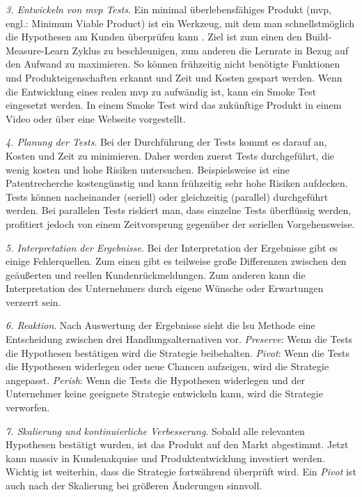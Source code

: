 \textit{3. Entwickeln von \gls{mvp} Tests}. Ein minimal überlebensfähiges Produkt (\gls{mvp}, engl.: Minimum Viable Product) ist ein Werkzeug, mit dem man schnellstmöglich die Hypothesen am Kunden überprüfen kann \cite[93]{Ries2011}. Ziel ist zum einen den Build-Measure-Learn Zyklus zu beschleunigen, zum anderen die Lernrate in Bezug auf den Aufwand zu maximieren. So können frühzeitig nicht benötigte Funktionen und Produkteigenschaften erkannt und Zeit und Kosten gespart werden. Wenn die Entwicklung eines realen \gls{mvp} zu aufwändig ist, kann ein Smoke Test eingesetzt werden. In einem Smoke Test wird das zukünftige Produkt in einem Video oder über eine Webseite vorgestellt.

\textit{4. Planung der Tests}. Bei der Durchführung der Tests kommt es darauf an, Kosten und Zeit zu minimieren. Daher werden zuerst Tests durchgeführt, die wenig kosten und hohe Risiken untersuchen. Beispielsweise ist eine Patentrecherche kostengünstig und kann frühzeitig sehr hohe Risiken aufdecken. Tests können nacheinander (seriell) oder gleichzeitig (parallel) durchgeführt werden. Bei parallelen Tests riskiert man, dass einzelne Tests überflüssig werden, profitiert jedoch von einem Zeitvorsprung gegenüber der seriellen Vorgehensweise. 

\textit{5. Interpretation der Ergebnisse}. Bei der Interpretation der Ergebnisse gibt es einige Fehlerquellen. Zum einen gibt es teilweise große Differenzen zwischen den geäußerten und reellen Kundenrückmeldungen. Zum anderen kann die Interpretation des Unternehmers durch eigene Wünsche oder Erwartungen verzerrt sein.

\textit{6. Reaktion}. Nach Auswertung der Ergebnisse sieht die \gls{lsu} Methode eine Entscheidung zwischen drei Handlungsalternativen vor. \textit{Preserve}: Wenn die Tests die Hypothesen bestätigen wird die Strategie beibehalten. \textit{Pivot}: Wenn die Tests die Hypothesen widerlegen oder neue Chancen aufzeigen, wird die Strategie angepasst. \textit{Perish}: Wenn die Tests die Hypothesen widerlegen und der Unternehmer keine geeignete Strategie entwickeln kann, wird die Strategie verworfen. 

\textit{7. Skalierung und kontinuierliche Verbesserung}. Sobald alle relevanten Hypothesen bestätigt wurden, ist das Produkt auf den Markt abgestimmt. Jetzt kann massiv in Kundenakquise und Produktentwicklung investiert werden. Wichtig ist weiterhin, dass die Strategie fortwährend überprüft wird. Ein \textit{Pivot} ist auch nach der Skalierung bei größeren Änderungen sinnvoll. 

